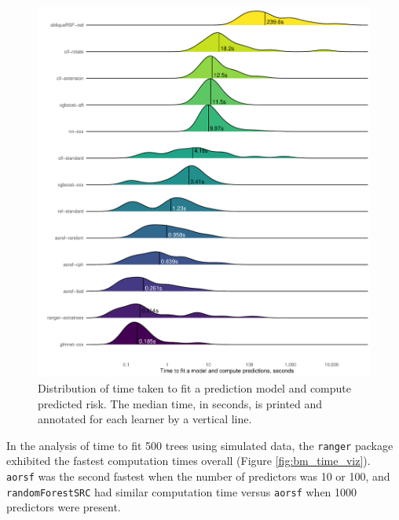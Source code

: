 \documentclass[12pt]{article}\usepackage[]{graphicx}\usepackage[]{xcolor}
\makeatletter
\def\maxwidth{ %
  \ifdim\Gin@nat@width>\linewidth
    \linewidth
  \else
    \Gin@nat@width
  \fi
}
\newenvironment{knitrout}{}{} %
\makeatother
\begin{document}
\begin{knitrout}
\color{fgcolor}\begin{figure}
\includegraphics[width=\maxwidth]{figure/bm_pred_time-1} \caption[Distribution of time taken to fit a prediction model and compute predicted risk]{Distribution of time taken to fit a prediction model and compute predicted risk. The median time, in seconds, is printed and annotated for each learner by a vertical line.}\label{fig:bm_pred_time}
\end{figure}

\end{knitrout}

In the analysis of time to fit 500 trees using simulated data, the \texttt{ranger} package exhibited the fastest computation times overall (Figure \ref{fig:bm_time_viz}). \texttt{aorsf} was the second fastest when the number of predictors was 10 or 100,  and \texttt{randomForestSRC} had similar computation time versus \texttt{aorsf} when 1000 predictors were present.
\end{document}
